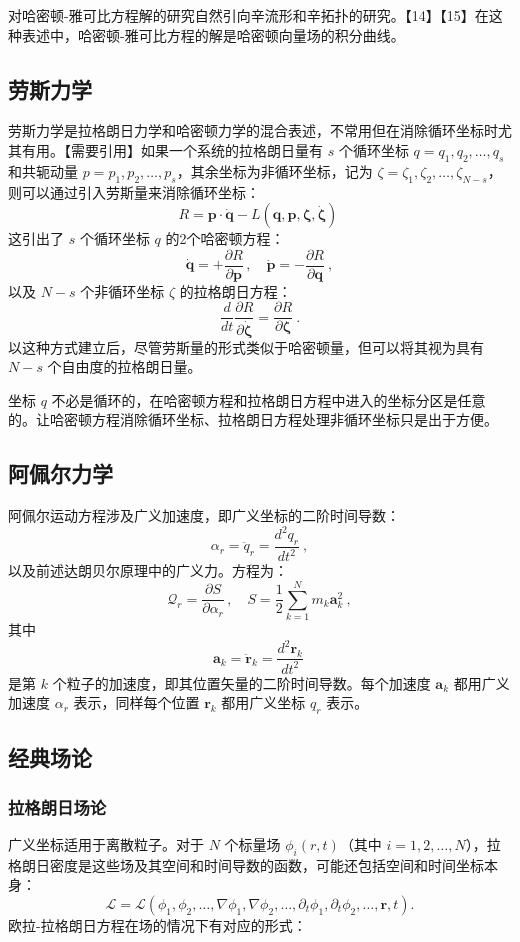 对哈密顿-雅可比方程解的研究自然引向辛流形和辛拓扑的研究。【14】【15】在这种表述中，哈密顿-雅可比方程的解是哈密顿向量场的积分曲线。
\subsection{劳斯力学}  
劳斯力学是拉格朗日力学和哈密顿力学的混合表述，不常用但在消除循环坐标时尤其有用。【需要引用】如果一个系统的拉格朗日量有 \( s \) 个循环坐标 \( q = q_1, q_2, \dots, q_s \) 和共轭动量 \( p = p_1, p_2, \dots, p_s \)，其余坐标为非循环坐标，记为 \( \zeta = \zeta_1, \zeta_2, \dots, \zeta_{N - s} \)，则可以通过引入劳斯量来消除循环坐标：
\[
R = \mathbf{p} \cdot \mathbf{\dot{q}} - L(\mathbf{q}, \mathbf{p}, \boldsymbol{\zeta}, \dot{\boldsymbol{\zeta}})~
\]
这引出了 \( s \) 个循环坐标 \( q \) 的2个哈密顿方程：
\[
\dot{\mathbf{q}} = +\frac{\partial R}{\partial \mathbf{p}} \,, \quad \dot{\mathbf{p}} = -\frac{\partial R}{\partial \mathbf{q}} ~,
\]
以及 \( N - s \) 个非循环坐标 \( \zeta \) 的拉格朗日方程：
\[
\frac{d}{dt} \frac{\partial R}{\partial \dot{\boldsymbol{\zeta}}} = \frac{\partial R}{\partial \boldsymbol{\zeta}} ~.
\]
以这种方式建立后，尽管劳斯量的形式类似于哈密顿量，但可以将其视为具有 \( N - s \) 个自由度的拉格朗日量。

坐标 \( q \) 不必是循环的，在哈密顿方程和拉格朗日方程中进入的坐标分区是任意的。让哈密顿方程消除循环坐标、拉格朗日方程处理非循环坐标只是出于方便。
\subsection{阿佩尔力学}   
阿佩尔运动方程涉及广义加速度，即广义坐标的二阶时间导数：
\[
\alpha_r = \ddot{q}_r = \frac{d^2 q_r}{dt^2} ~,
\]
以及前述达朗贝尔原理中的广义力。方程为：
\[
\mathcal{Q}_r = \frac{\partial S}{\partial \alpha_r} \,, \quad S = \frac{1}{2} \sum_{k=1}^{N} m_k \mathbf{a}_k^2 ~,
\]
其中
\[
\mathbf{a}_k = \ddot{\mathbf{r}}_k = \frac{d^2 \mathbf{r}_k}{dt^2}~
\]
是第 \( k \) 个粒子的加速度，即其位置矢量的二阶时间导数。每个加速度 \( \mathbf{a}_k \) 都用广义加速度 \( \alpha_r \) 表示，同样每个位置 \( \mathbf{r}_k \) 都用广义坐标 \( q_r \) 表示。
\subsection{经典场论}  
\subsubsection{拉格朗日场论}  
广义坐标适用于离散粒子。对于 \( N \) 个标量场 \( \phi_i(r, t) \)（其中 \( i = 1, 2, \dots, N \)），拉格朗日密度是这些场及其空间和时间导数的函数，可能还包括空间和时间坐标本身：
\[
\mathcal{L} = \mathcal{L}(\phi_1, \phi_2, \dots, \nabla \phi_1, \nabla \phi_2, \dots, \partial_t \phi_1, \partial_t \phi_2, \dots, \mathbf{r}, t) .
\]
欧拉-拉格朗日方程在场的情况下有对应的形式：

